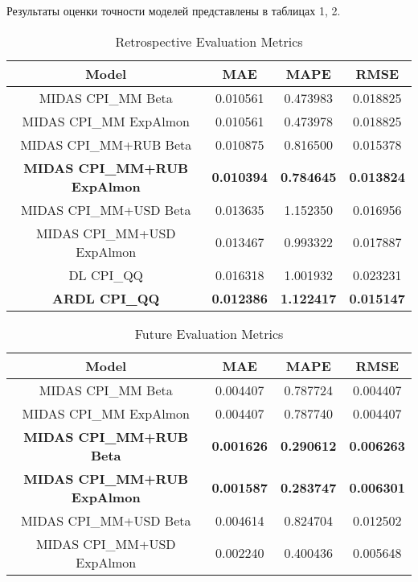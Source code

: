 \documentclass[a4paper, 12pt]{extarticle}
\begin{document}
	Результаты оценки точности моделей представлены в таблицах 1, 2.
		\begin{table}[h]
			\centering
			\caption{Retrospective Evaluation Metrics}
			\label{tab:evaluation_metrics}
			\begin{tabular}{|c|c|c|c|}
				\hline
				Model & MAE & MAPE & RMSE \\
				\hline
				MIDAS CPI\_MM Beta          & 0.010561 & 0.473983 & 0.018825 \\
				MIDAS CPI\_MM ExpAlmon      & 0.010561 & 0.473978 & 0.018825 \\
				MIDAS CPI\_MM+RUB Beta      & 0.010875 & 0.816500 & 0.015378 \\
				\textbf{MIDAS CPI\_MM+RUB ExpAlmon}  & \textbf{0.010394} & \textbf{0.784645} & \textbf{0.013824} \\
				MIDAS CPI\_MM+USD Beta      & 0.013635 & 1.152350 & 0.016956 \\
				MIDAS CPI\_MM+USD ExpAlmon  & 0.013467 & 0.993322 & 0.017887 \\
				DL CPI\_QQ                 & 0.016318 & 1.001932 & 0.023231 \\
				\textbf{ARDL CPI\_QQ}               & \textbf{0.012386} & \textbf{1.122417} & \textbf{0.015147} \\
				\hline
			\end{tabular}
		\end{table}
		
		\begin{table}[htbp]
			\centering
			\caption{Future Evaluation Metrics}
			\label{tab:evaluation_metrics}
			\begin{tabular}{|c|c|c|c|}
				\hline
				Model & MAE & MAPE & RMSE \\
				\hline
				MIDAS CPI\_MM Beta          & 0.004407 & 0.787724 & 0.004407 \\
				MIDAS CPI\_MM ExpAlmon      & 0.004407 & 0.787740 & 0.004407 \\
				\textbf{MIDAS CPI\_MM+RUB Beta}      & \textbf{0.001626} & \textbf{0.290612} & \textbf{0.006263} \\
				\textbf{MIDAS CPI\_MM+RUB ExpAlmon}  & \textbf{0.001587} & \textbf{0.283747} & \textbf{0.006301} \\
				MIDAS CPI\_MM+USD Beta      & 0.004614 & 0.824704 & 0.012502 \\
				MIDAS CPI\_MM+USD ExpAlmon  & 0.002240 & 0.400436 & 0.005648 \\
				\hline
			\end{tabular}
		\end{table}
\end{document}
